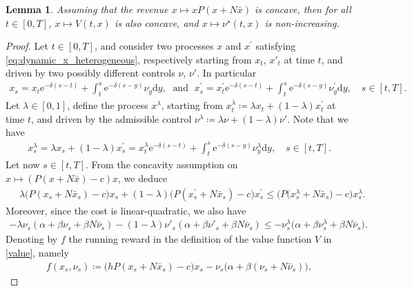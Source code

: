 \documentclass[12pt]{article}
\newtheorem{lemma}{Lemma}[section]
\def\erm{\mathrm{e}}
\def\drm{\mathrm{d}}
\begin{document}
\begin{lemma}\label{V_concave}
Assuming that the revenue $x \longmapsto x P(x+N\bar{x})$ is concave, then for all $t \in [0,T]$, $x \longmapsto V(t,x)$ is also concave, and $x \longmapsto \nu^\star(t,x)$ is non-increasing.
\end{lemma}
\begin{proof}
Let $t \in [0,T]$, and consider two processes $x$ and $x^\prime$ satisfying \eqref{eq:dynamic_x_heterogeneous}, respectively starting from $x_t$, $x'_t$ at time $t$, and driven by two possibly different controls $\nu$, $\nu'$. In particular
\begin{align*}
    x_s=x_t \erm^{-\delta(s-t)}+\int_{t}^{s} \erm^{-\delta(s-y)}\nu_y \drm y, \;
    \text{ and } \;
    x^\prime_s=x^\prime_t \erm^{-\delta(s-t)}+\int_{t}^{s} \erm^{-\delta(s-y)}\nu^\prime_y \drm y, \quad s \in [t,T].
\end{align*}
Let $\lambda \in [0,1]$, define the process $x^\lambda$, starting from $x_t^\lambda \coloneq \lambda x_t + (1-\lambda)x_t^\prime$ at time $t$, and driven by the admissible control $\nu^\lambda \coloneq \lambda\nu+(1-\lambda)\nu'$. Note that we have
\begin{align*}
    x_s^\lambda = \lambda x_s + (1-\lambda)x_s^\prime = x^\lambda_t \erm^{-\delta(s-t)}+\int_{t}^{s} \erm^{-\delta(s-y)}\nu^\lambda_y \drm y, \quad s \in [t,T].
\end{align*}
Let now $s \in [t,T]$. From the concavity assumption on $x \longmapsto (P(x+N\bar{x})-c)x$, we deduce
\begin{align}\label{ineq1}
    &\ \lambda \big( P(x_s+N\bar{x}_s)-c \big) x_s + (1-\lambda) \big( P(x^\prime_s+N\bar{x}_s)-c \big) x^\prime_s
    \leq \big( P \big( x_s^\lambda +N\bar{x}_s \big) - c \big) x_s^\lambda.
\end{align}
Moreover, since the cost is linear-quadratic, we also have
\begin{align}\label{ineq2}
    -\lambda\nu_s(\alpha+\beta \nu_s+\beta N \bar{\nu}_s)-(1-\lambda)\nu'_s(\alpha+\beta \nu'_s+\beta N \bar{\nu}_s)
    \leq - \nu^\lambda_s \big( \alpha+\beta \nu^\lambda_s + \beta N \bar{\nu}_s \big).
\end{align}
Denoting by $f$ the running reward in the definition of the value function $V$ in \eqref{value}, namely
\begin{align}\label{running_reward}
    f(x_s, \nu_s) \coloneq \big( h P(x_s + N\bar{x}_s)-c \big) x_s - \nu_s \big( \alpha+\beta(\nu_s+N\bar{\nu}_s) \big),
\end{align}

\end{proof}
\end{document}
